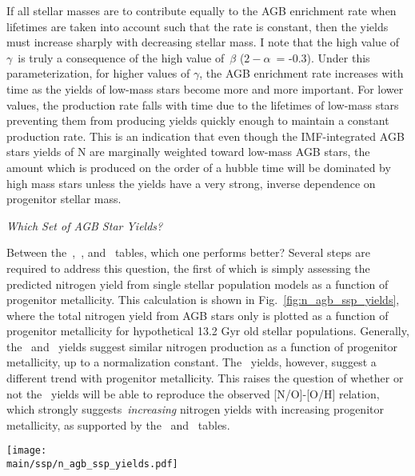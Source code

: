 \documentclass[\main/notes.tex]{subfiles}
\begin{document}
If all stellar masses are to contribute equally to the AGB enrichment rate when 
lifetimes are taken into account such that the rate is constant, then the 
yields must increase sharply with decreasing stellar mass. I note that the 
high value of~$\gamma$~is truly a consequence of the high value of~$\beta$ 
($2 - \alpha$~= -0.3). Under this parameterization, for higher values of 
$\gamma$, the AGB enrichment rate increases with time as the yields of low-mass 
stars become more and more important. For lower values, the production rate 
falls with time due to the lifetimes of low-mass stars preventing them from 
producing yields quickly enough to maintain a constant production rate. This 
is an indication that even though the IMF-integrated AGB stars yields of N are 
marginally weighted toward low-mass AGB stars, the amount which is produced on 
the order of a hubble time will be dominated by high mass stars unless the 
yields have a very strong, inverse dependence on progenitor stellar mass. 

\twolineskip 
{\Large \textit{Which Set of AGB Star Yields?}} 
\par\noindent 
Between the~\citet{Cristallo2011},~\citet{Karakas2010}, and~\citet{Ventura2013} 
tables, which one performs better? 
Several steps are required to address this question, the first of which is 
simply assessing the predicted nitrogen yield from single stellar population 
models as a function of progenitor metallicity. 
This calculation is shown in Fig.~\ref{fig:n_agb_ssp_yields}, where the total 
nitrogen yield from AGB stars only is plotted as a function of progenitor 
metallicity for hypothetical 13.2 Gyr old stellar populations. 
Generally, the~\citet{Cristallo2011} and~\citet{Ventura2013} yields suggest 
similar nitrogen production as a function of progenitor metallicity, up to a 
normalization constant. 
The~\citet{Karakas2010} yields, however, suggest a different trend with 
progenitor metallicity. 
This raises the question of whether or not the~\citet{Karakas2010} yields will 
be able to reproduce the observed [N/O]-[O/H] relation, which strongly 
suggests~\textit{increasing} nitrogen yields with increasing progenitor 
metallicity, as supported by the~\citet{Cristallo2011} and~\citet{Ventura2013} 
tables. 

\begin{figure*} 
\centering 
\texttt{[image: \\main/ssp/n\_agb\_ssp\_yields.pdf]} 
\caption{
Total nitrogen production by AGB stars from a hypothetical 13.2 Gyr old 
stellar population as a function of progenitor metallicity; only AGB stars have 
non-zero yields in this calculation. 
Curves show the predicted nitrogen production normalized by the initial mass 
of the stellar population assuming the~\citet{Cristallo2011} (red), 
\citet{Karakas2010} (blue), and~\citet{Ventura2013} (black) tables. 
Points are plotted at the metallicities at which each study has reported 
yields. 
}
\label{fig:n_agb_ssp_yields} 
\end{figure*} 

\biblio  
\end{document}
